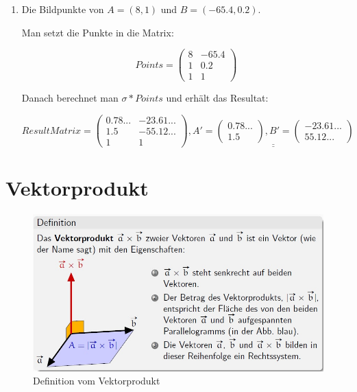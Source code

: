 \begin{enumerate}
Nun muss man dies nur noch in die Spiegelungsmatrix einsetzen:

\[
\sigma' = 
\begin{pmatrix}
\frac{5}{14} & \frac{6}{7} & 0\\
\frac{6}{7} & -\frac{5}{14} & 0\\
0 & 0 & 1
\end{pmatrix}
\]

Schliesslich kann man "da real"-Spiegelungsmatrix $\sigma$ folgendermassen berechnen:

\[
\underline{\underline{\sigma = T^{-1}\sigma T = 
\begin{pmatrix}
\frac{5}{14} & \frac{6}{7} & -\frac{6}{14}\\
\frac{6}{7} & -\frac{5}{14} & 1\\
0 & 0 & 1
\end{pmatrix}}}
\]

\item Die Bildpunkte von $A = (8, 1)$ und $B=(-65.4, 0.2)$.

Man setzt die Punkte in die Matrix:

\[
Points = \begin{pmatrix}
8 & -65.4 \\
1 & 0.2 \\
1 & 1
\end{pmatrix}
\]

Danach berechnet man $\sigma * Points$ und erhält das Resultat:

\[
ResultMatrix = \begin{pmatrix}
0.78... & -23.61... \\
1.5 & -55.12... \\
1 & 1
\end{pmatrix}, 
\underline{\underline{A' = 
\begin{pmatrix}
0.78...\\
1.5 
\end{pmatrix}, B' = 
\begin{pmatrix}
-23.61... \\
55.12... 
\end{pmatrix}}}
\]

\end{enumerate}

\section{Vektorprodukt}

\begin{figure}[!ht]
	\centering
	\includegraphics[width=0.7\linewidth]{fig/vektorprodukt_definition}
	\caption{Definition vom Vektorprodukt}
	\label{fig:vektorprodukt_definition}
\end{figure}

